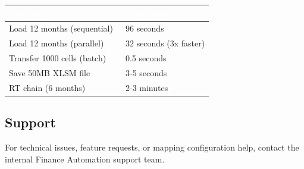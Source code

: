 \documentclass[11pt,a4paper]{article}
\begin{document}
\begin{center}
\begin{tabularx}{0.88\linewidth}{@{} l X @{}}
\toprule
\rowcolor{PrimaryBlue}
\textcolor{White}{\textbf{Operation}} & \textcolor{White}{\textbf{Performance}} \\
\midrule
Load 12 months (sequential)  & ~96 seconds \\
Load 12 months (parallel)    & ~32 seconds (3x faster) \\
Transfer 1000 cells (batch)  & ~0.5 seconds \\
Save 50MB XLSM file          & ~3-5 seconds \\
RT chain (6 months)          & ~2-3 minutes \\
\bottomrule
\end{tabularx}
\end{center}

\subsection{Support}

For technical issues, feature requests, or mapping configuration help, contact the internal Finance Automation support team.

\vspace{1cm}

\begin{center}
\end{center}
\end{document}
